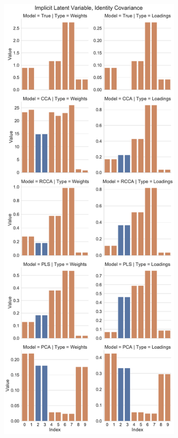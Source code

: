 \begin{figure}
\centering
\begin{subfigure}{0.49\linewidth}
\centering
\includegraphics[width=\linewidth]{figures/simulated/Combined_Weights_Loadings_with_Error_Bars_Identity_Covariance_implicit.pdf}

\end{subfigure}
\end{figure}
